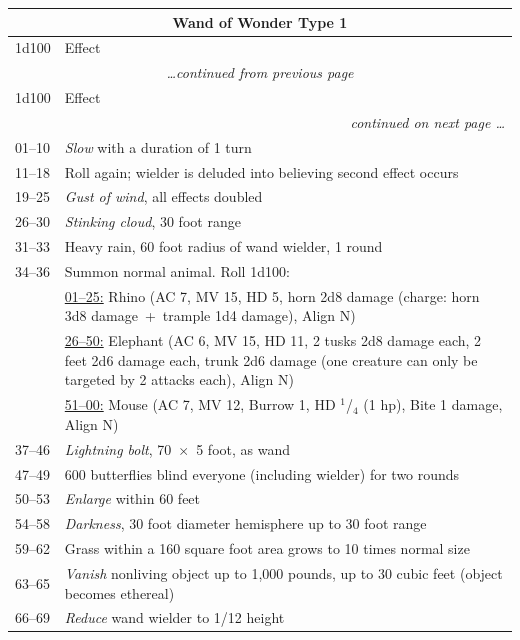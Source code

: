 \noindent \begin{longtable}{|p{}|p{}|}
\multicolumn{2}{c}{Wand of Wonder Type 1} \\
\hline
1d100	& Effect \\
\hline\hline
\endfirsthead
\multicolumn{2}{c}{\textit{\ldots continued from previous page}} \\
\hline
1d100	& Effect \\
\hline\hline
\endhead
\hline
\multicolumn{2}{r}{\textit{continued on next page \ldots}}\\
\endfoot
\hline
\endlastfoot
\rowcolor[gray]{.9}01--10	& \textit{Slow} with a duration of 1 turn \\
11--18	& Roll again; wielder is deluded into believing second effect occurs \\
\rowcolor[gray]{.9}19--25	& \textit{Gust of wind}, all effects doubled \\
26--30	& \textit{Stinking cloud}, 30 foot range \\
\rowcolor[gray]{.9}31--33	& Heavy rain, 60 foot radius of wand wielder, 1 round \\
34--36	& Summon normal animal.  Roll 1d100: \\
		& \underline{01--25:} Rhino (AC 7, MV 15, HD 5, horn 2d8 damage (charge: horn 3d8 damage~+~trample 1d4 damage), Align N) \\
		& \underline{26--50:} Elephant (AC 6, MV 15, HD 11, 2 tusks 2d8 damage each, 2 feet 2d6 damage each, trunk 2d6 damage (one creature can only be targeted by 2 attacks each), Align N) \\
		& \underline{51--00:} Mouse (AC 7, MV 12, Burrow 1, HD $^1$/$_4$ (1 hp), Bite 1 damage, Align N) \\
\rowcolor[gray]{.9}37--46	& \textit{Lightning bolt}, 70~$\times$~5 foot, as wand \\
47--49	& 600 butterflies blind everyone (including wielder) for two rounds \\
\rowcolor[gray]{.9}50--53	& \textit{Enlarge} within 60 feet \\
54--58	& \textit{Darkness}, 30 foot diameter hemisphere up to 30 foot range \\
\rowcolor[gray]{.9}59--62	& Grass within a 160 square foot area grows to 10 times normal size \\
63--65	& \textit{Vanish} nonliving object up to 1,000 pounds, up to 30 cubic feet (object becomes ethereal) \\
\rowcolor[gray]{.9}66--69	& \textit{Reduce} wand wielder to 1/12 height \\

\end{longtable}
